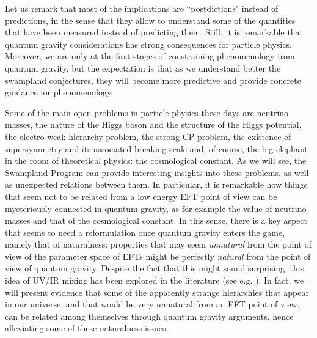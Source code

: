 \documentclass[11pt,a4paper]{article}
\begin{document}
Let us remark  that most of the implications are ``postdictions" instead of predictions, in the sense that they allow to understand some of the quantities that have been measured instead of predicting them. Still, it is remarkable that quantum gravity considerations has strong consequences  for particle physics. 
Moreover, we are only at the first stages of constraining phenomenology from quantum gravity, but the expectation is that as we understand better the swampland conjectures, they will become more predictive and provide concrete guidance for phenomenology.

Some of the main open problems in particle physics these days are neutrino masses, the nature of the Higgs boson and the structure of the Higgs potential, the electro-weak hierarchy problem, the strong CP problem, the existence of supersymmetry and its associated breaking scale and, of course, the big elephant in the room of theoretical physics: the cosmological constant. As we will see, the Swampland Program can provide interesting insights into these problems, as well as unexpected relations between them. In particular, it is remarkable how things that seem not to be related from a low energy EFT point of view can be mysteriously connected in quantum gravity, as for example the value of neutrino masses and that of the cosmological constant. In this sense, there is a key aspect that seems to need a reformulation once quantum gravity enters the game, namely that of naturalness:
properties that may seem \emph{unnatural} from the point of view of the parameter space of EFTs might be perfectly \emph{natural} from the point of view of quantum gravity. Despite the fact that this might sound surprising, this idea of UV/IR mixing has been explored in the literature (see e.g. \cite{Cheung:2014vva,Lust:2017wrl,Craig:2018yvw,Craig:2019fdy}). In fact, we will present evidence that some of the apparently strange hierarchies that appear in our universe, and that would be very unnatural from an EFT point of view, can be related among themselves through quantum gravity arguments, hence alleviating some of these naturalness issues. 
\end{document}
